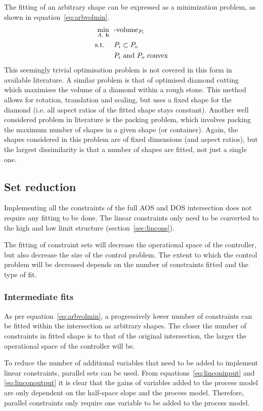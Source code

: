 The fitting of an arbitrary shape can be expressed as a minimization problem, as shown in equation~\ref{eq:arbvolmin}.
\begin{align}
  \label{eq:arbvolmin}
    \min_{A,~{\bf {b}}}~~&\text{-volume}_{P_i}\\
    \text{s.t.}~~~~ &P_i \subset P_o \notag \\
                    &P_i \text{~and~} P_o \text{~convex} \notag
\end{align}
This seemingly trivial optimisation problem is not covered in this form in available literature.
A similar problem is that of optimised diamond cutting \citep{diamondcut} which maximises the volume of a diamond within a rough stone.
This method allows for rotation, translation and scaling, but uses a fixed shape for the diamond (i.e. all aspect ratios of the fitted shape stays constant).
Another well considered problem in literature is the packing problem, which involves packing the maximum number of shapes in a given shape (or container).
Again, the shapes considered in this problem are of fixed dimensions (and aspect ratios), but the largest dissimilarity is that a number of shapes are fitted, not just a single one.

\subsection{Set reduction}
Implementing all the constraints of the full AOS and DOS intersection does not require any fitting to be done.
The linear constraints only need to be converted to the high and low limit structure (section~\ref{sec:lincons}).

The fitting of constraint sets will decrease the operational space of the controller, but also decrease the size of the control problem.
The extent to which the control problem will be decreased depends on the number of constraints fitted and the type of fit.

\subsubsection{Intermediate fits}
As per equation~\ref{eq:arbvolmin}, a progressively lower number of constraints can be fitted within the intersection as arbitrary shapes.
The closer the number of constraints in fitted shape is to that of the original intersection, the larger the operational space of the controller will be.

To reduce the number of additional variables that need to be added to implement linear constraints, parallel sets can be used.
From equations~\ref{eq:linconinput} and \ref{eq:linconoutput} it is clear that the gains of variables added to the process model are only dependent on the half-space slope and the process model.
Therefore, parallel constraints only require one variable to be added to the process model.

